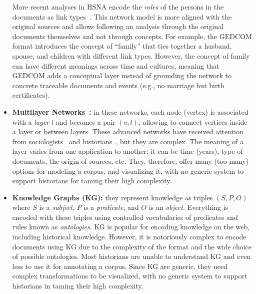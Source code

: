\begin{itemize}[nosep,leftmargin=*]
    More recent analyses in HSNA encode the \emph{roles} of the persons in the documents as link types~\cite{Cristofoli2018}. This network model is more aligned with the original sources and allows following an analysis through the original documents themselves and not through concepts. For example, the GEDCOM format introduces the concept of ``family'' that ties together a husband, spouse, and children with different link types.
    However, the concept of family can have different meanings across time and cultures, meaning that GEDCOM adds a conceptual layer instead of grounding the network to concrete traceable documents and events (e.g., no marriage but birth certificates).
    \item \textbf{Multilayer Networks~\cite{multilayer}: } in these networks, each node (vertex) is associated with a \emph{layer} $l$ and becomes a pair $(v, l)$, allowing to connect vertices inside a layer or between layers. These advanced networks have received attention from sociologists~\cite{CRNOVRSANIN201456} and historians~\cite{vanVugt_2017}, but they are complex. The meaning of a layer varies from one application to another; it can be time (years), type of documents, the origin of sources, etc. They, therefore, offer many (too many) options for modeling a corpus, and visualizing it, with no generic system to support historians for taming their high complexity.
    \item \textbf{Knowledge Graphs (KG)\cite{hoganKnowledgeGraphs2021}: } they represent knowledge as triples $(S, P, O)$ where $S$ is a \emph{subject}, $P$ is a \emph{predicate}, and $O$ is an \emph{object}. Everything is encoded with these triples using controlled vocabularies of predicates and rules known as \emph{ontologies}. KG is popular for encoding knowledge on the web, including historical knowledge. However, it is notoriously complex to encode documents using KG due to the complexity of the format and the wide choice of possible ontologies. Most historians are unable to understand KG and even less to use it for annotating a corpus. Since KG are generic, they need complex transformations to be visualized, with no generic system to support historians in taming their high complexity.
\end{itemize}


